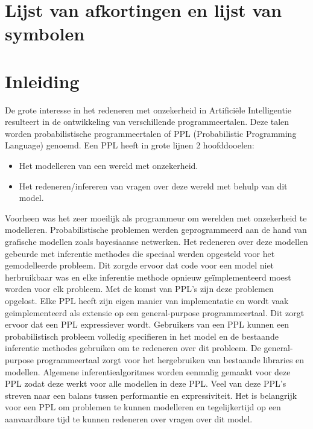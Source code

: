 \documentclass[12pt,a4paper,oneside]{book}
\theoremstyle{definition}
\begin{document}
\chapter{Lijst van afkortingen en lijst van symbolen}
\tableofcontents


\newpage
\mainmatter
\setcounter{page}{0}

\chapter{Inleiding}
De grote interesse in het redeneren met onzekerheid in Artifici\"{e}le Intelligentie resulteert in de ontwikkeling van verschillende programmeertalen. Deze talen worden probabilistische programmeertalen of PPL (Probabilistic Programming Language) genoemd. Een PPL heeft in grote lijnen 2 hoofddooelen:
\begin{itemize}
  \item Het modelleren van een wereld met onzekerheid.
  \item Het redeneren/infereren van vragen over deze wereld met behulp van dit model.
\end{itemize}
Voorheen was het zeer moeilijk als programmeur om werelden met onzekerheid te modelleren. Probabilistische problemen werden geprogrammeerd aan de hand van grafische modellen zoals bayesiaanse netwerken. Het redeneren over deze modellen gebeurde met inferentie methodes die speciaal werden opgesteld voor het gemodelleerde probleem. Dit zorgde ervoor dat code voor een model niet herbruikbaar was en elke inferentie methode opnieuw ge\"{i}mplementeerd moest worden voor elk probleem. Met de komst van PPL’s zijn deze problemen opgelost. Elke PPL heeft zijn eigen manier van implementatie en wordt vaak ge\"{i}mplementeerd als extensie op een general-purpose programmeertaal. Dit zorgt ervoor dat een PPL expressiever wordt. Gebruikers van een PPL kunnen een probabilistisch probleem volledig specifieren in het model en de bestaande inferentie methodes gebruiken om te redeneren over dit probleem. De general-purpose programmeertaal zorgt voor het hergebruiken van bestaande libraries en modellen. Algemene inferentiealgoritmes worden eenmalig gemaakt voor deze PPL zodat deze werkt voor alle modellen in deze PPL. Veel van deze PPL’s streven naar een balans tussen performantie en expressiviteit. Het is belangrijk voor een PPL om problemen te kunnen modelleren en tegelijkertijd op een aanvaardbare tijd te kunnen redeneren over vragen over dit model.
\end{document}
